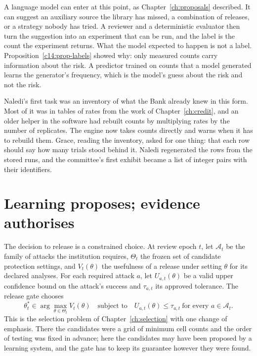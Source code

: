 A language model can enter at this point, as Chapter~\ref{ch:proposals} described. It can suggest an
auxiliary source the library has missed, a combination of releases, or a strategy nobody has
tried. A reviewer and a deterministic evaluator then turn the suggestion into an experiment
that can be run, and the label is the count the experiment returns. What the model expected
to happen is not a label. Proposition~\ref{c14:prop-labels} showed why: only measured counts carry information about the risk. A predictor trained on counts that a model generated learns the
generator's frequency, which is the model's guess about the risk and not the risk.

Naledi's first task was an inventory of what the Bank already knew in this form. Most
of it was in tables of rates from the work of Chapter~\ref{ch:credit}, and an older helper in the software
had rebuilt counts by multiplying rates by the number of replicates. The engine now takes
counts directly and warns when it has to rebuild them. Grace, reading the inventory, asked
for one thing: that each row should say how many trials stood behind it. Naledi regenerated
the rows from the stored runs, and the committee's first exhibit became a list of integer pairs
with their identifiers.

\section{Learning proposes; evidence authorises}\label{c18:sec-gate}

The decision to release is a constrained choice. At review epoch $t$, let $\mathcal A_t$ be the family of
attacks the institution requires, $\Theta_t$ the frozen set of candidate protection settings, and $V_t(\theta)$
the usefulness of a release under setting $\theta$ for its declared analyses. For each required attack
$a$, let $U_{a,t}(\theta)$ be a valid upper confidence bound on the attack's success and $\tau_{a,t}$ its approved
tolerance. The release gate chooses
\begin{equation}\label{c18:eq-gate}
\theta_t^\ast\in\arg\max_{\theta\in\Theta_t} V_t(\theta)\quad\text{subject to}\quad U_{a,t}(\theta)\le\tau_{a,t}\ \text{for every }a\in\mathcal A_t .
\end{equation}
This is the selection problem of Chapter~\ref{ch:selection} with one change of emphasis. There the candidates
were a grid of minimum cell counts and the order of testing was fixed in advance; here
the candidates may have been proposed by a learning system, and the gate has to keep its
guarantee however they were found.

